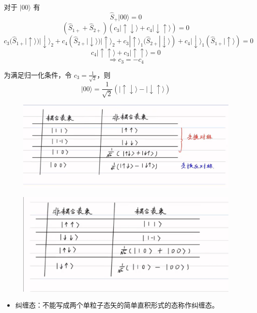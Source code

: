 \documentclass[lang=cn,10pt]{elegantbook}
\begin{document}
对于 $|00\rangle$ 有
\[
\hat{S}_+ |00\rangle = 0
\]
\[
(\hat{S}_{1+} + \hat{S}_{2+}) (c_3 |\uparrow\downarrow\rangle + c_4 |\downarrow\uparrow\rangle) = 0
\]
\[
c_3 (\hat{S}_{1+} |\uparrow\rangle) |\downarrow\rangle_2 + c_4 (\hat{S}_{2+} |\downarrow\rangle) |\uparrow\rangle_2 + c_3 |\uparrow\rangle_1 (\hat{S}_{2+} |\downarrow\rangle) + c_4 |\downarrow\rangle_1 (\hat{S}_{1+} |\uparrow\rangle) = 0
\]
\[
c_4 |\uparrow\uparrow\rangle + c_3 |\uparrow\uparrow\rangle = 0
\]
\[
\Longrightarrow c_3 = -c_4
\]

为满足归一化条件，令 $c_3 = \frac{1}{\sqrt{2}}$，则
\[
|00\rangle = \frac{1}{\sqrt{2}} (|\uparrow\downarrow\rangle - |\downarrow\uparrow\rangle)
\]
\begin{figure}[H]
	\centering
	\includegraphics[width=0.7\linewidth]{figure/screenshot0031}
\end{figure}

\begin{figure}[H]
	\centering
	\includegraphics[width=0.7\linewidth]{figure/screenshot0032}
\end{figure}


\begin{itemize}
	\item 纠缠态：不能写成两个单粒子态矢的简单直积形式的态称作纠缠态。
\end{itemize}
\end{document}
